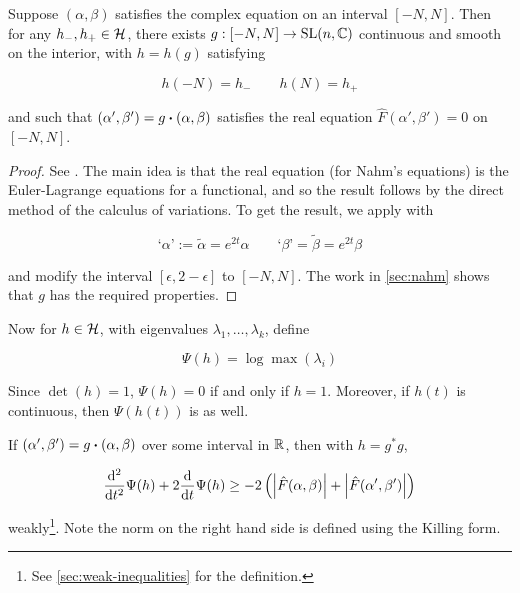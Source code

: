 \documentclass{report}
\begin{document}
\begin{lemma}
    \label{lem:gauge-exists-with-dirichlet}
    Suppose \((\alpha, \beta)\) satisfies the complex equation on an interval \([-N, N]\). Then for any \(h_-, h_+ \in \mathcal{H}\), there exists \(g : [-N, N] \to \operatorname{SL}(n, \mathbb{C})\) continuous and smooth on the interior, with \(h = h(g)\) satisfying

    \[h(-N) = h_- \qquad h(N) = h_+\]

    and such that \((\alpha', \beta') = g \vdot (\alpha, \beta)\) satisfies the real equation \(\hat F(\alpha', \beta') = 0\) on \([-N, N]\).
\end{lemma}

\begin{proof}
    See \cite[Proposition 2.8]{donaldson_nahms_1984}. The main idea is that the real equation (for Nahm's equations) is the Euler-Lagrange equations for a functional, and so the result follows by the direct method of the calculus of variations. To get the result, we apply \cite[Proposition 2.8]{donaldson_nahms_1984} with

    \[\text{`}\alpha\text{'} := \tilde \alpha = e^{2t}\alpha \qquad \text{`}\beta\text{'} = \tilde\beta = e^{2t}\beta\]

    and modify the interval \([\epsilon, 2-\epsilon]\) to \([-N, N]\). The work in \cref{sec:nahm} shows that \(g\) has the required properties.
\end{proof}

Now for \(h \in \mathcal{H}\), with eigenvalues \(\lambda_1, \dots, \lambda_k\), define

\[\Psi(h) = \log\max(\lambda_i)\]

Since \(\det(h) = 1\), \(\Psi(h) = 0\) if and only if \(h = 1\). Moreover, if \(h(t)\) is continuous, then \(\Psi(h(t))\) is as well.

\begin{lemma}
    \label{lem:differential-inequality}

    If \((\alpha', \beta') = g \vdot (\alpha, \beta)\) over some interval in \(\mathbb{R}\), then with \(h = g^*g\),

    \[\dv[2]{t}\Psi(h) + 2\dv{t}\Psi(h) \ge -2\left(\abs{\hat F(\alpha, \beta)} + \abs{\hat F(\alpha', \beta')}\right)\]

    weakly\footnote{See \cref{sec:weak-inequalities} for the definition.}. Note the norm on the right hand side is defined using the Killing form.
\end{lemma}
\end{document}
